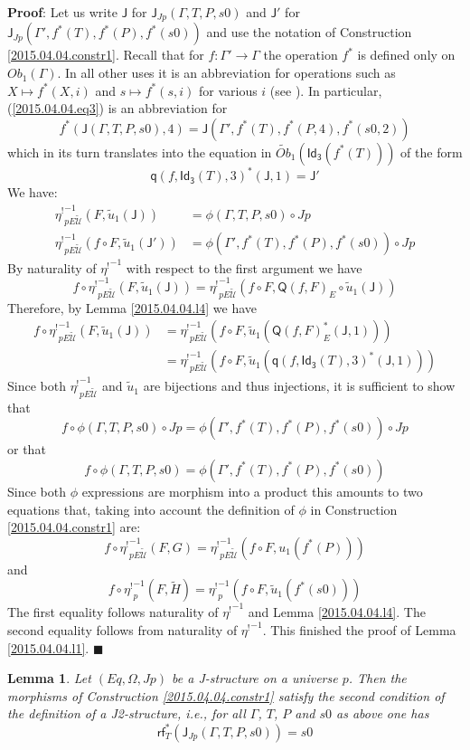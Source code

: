 \documentclass[12pt]{article}
\numberwithin{equation}{section}
\newenvironment{myproof}{{\bf Proof}:}{$\blacksquare$ \vskip 5mm }
\newtheorem{lemma}[proposition]{Lemma}
\newcommand{\sr}{\rightarrow}
\newcommand{\wt}{\widetilde}
\newcommand{\q}{\mathsf{q}}
\newcommand{\Idx}{\mathsf{Id_3}} %
\newcommand{\J}{\mathsf{J}}
\newcommand{\U}{\mathcal{U}}
\newcommand{\rf}{\mathsf{rf}}
\newcommand{\Q}{\mathsf{Q}}
\newcommand{\etashriek}{\eta^!}
\newcommand{\etaunshriek}{{\etashriek}^{-1}}
\newcommand{\Obwt}{\wt{Ob}}
\begin{document}
\begin{myproof}
Let us write $\J$ for $\J_{Jp}(\Gamma,T,P,s0)$ and $\J'$ for
$\J_{Jp}(\Gamma',f^*(T),f^*(P),f^*(s0))$ and use the notation of Construction
\ref{2015.04.04.constr1}. Recall that for $f:\Gamma'\sr \Gamma$ the operation
$f^*$ is defined only on $Ob_1(\Gamma)$. In all other uses it is an
abbreviation for operations such as $X\mapsto f^*(X,i)$ and $s\mapsto f^*(s,i)$
for various $i$ (see \cite{Csubsystems}). In particular, (\ref{2015.04.04.eq3})
is an abbreviation for
%
$$f^*(\J(\Gamma,T,P,s0),4)=\J(\Gamma',f^*(T),f^*(P,4),f^*(s0,2))$$
%
which in its turn translates into the equation in $\Obwt_1(\Idx(f^*(T)))$ of
the form
%
$$\q(f,\Idx(T),3)^*(\J,1)=\J'$$
%
We have:
%
\begin{align*}
  \etaunshriek_{pE\wt{\U}}(F,\wt{u}_1(\J))&=\phi(\Gamma,T,P,s0)\circ Jp \\
  \etaunshriek_{pE\wt{\U}}(f\circ F, \wt{u}_1(\J'))&=\phi(\Gamma',f^*(T),f^*(P),f^*(s0))\circ Jp
\end{align*}
%
By naturality of $\etaunshriek$ with respect to the first argument we have
%
$$f\circ \etaunshriek_{pE\wt{\U}}(F,\wt{u}_1(\J))=\etaunshriek_{pE\wt{\U}}(f\circ F,
\Q(f,F)_{E}\circ \wt{u}_1(\J))$$
%
Therefore, by Lemma \ref{2015.04.04.l4} we have
%
\begin{align*}
  f\circ \etaunshriek_{pE\wt{\U}}(F,\wt{u}_1(\J))
    & = \etaunshriek_{pE\wt{\U}}(f\circ F, \wt{u}_1(\Q(f,F)_{E}^*(\J,1))) \\
    & = \etaunshriek_{pE\wt{\U}}(f\circ F, \wt{u}_1(\q(f,\Idx(T),3)^*(\J,1)))
\end{align*}
%
Since both $\etaunshriek_{pE\wt{\U}}$ and $\wt{u}_1$ are bijections and thus
injections, it is sufficient to show that
%
$$f\circ \phi(\Gamma,T,P,s0)\circ Jp = \phi(\Gamma',f^*(T),f^*(P),f^*(s0))\circ
Jp$$
%
or that
%
$$f\circ \phi(\Gamma,T,P,s0)=\phi(\Gamma',f^*(T),f^*(P),f^*(s0))$$
%
Since both $\phi$ expressions are morphism into a product this amounts to two
equations that, taking into account the definition of $\phi$ in Construction
\ref{2015.04.04.constr1} are:
%
$$f\circ \etaunshriek_{pE\wt{\U}}(F,G)=\etaunshriek_{pE\wt{\U}}(f\circ F, u_1(f^*(P)))$$
%
and
%
$$f\circ \etaunshriek_p(F,\wt{H})=\etaunshriek_p(f\circ F, \wt{u}_1(f^*(s0)))$$
%
The first equality follows naturality of $\etaunshriek$ and Lemma
\ref{2015.04.04.l4}. The second equality follows from naturality of
$\etaunshriek$. This finished the proof of Lemma \ref{2015.04.04.l1}.
\end{myproof}
%
\begin{lemma}
\label{2015.04.04.l5} Let $(Eq,\Omega,Jp)$ be a J-structure on a universe
$p$. Then the morphisms of Construction \ref{2015.04.04.constr1} satisfy the
second condition of the definition of a J2-structure, i.e., for all $\Gamma$,
$T$, $P$ and $s0$ as above one has
%
$$\rf_T^*(\J_{Jp}(\Gamma,T,P,s0))=s0$$
%
\end{lemma}
\end{document}
